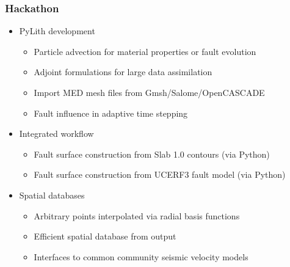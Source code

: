 \documentclass[aspectratio=169]{beamer}
\begin{document}
\begin{frame}
  \frametitle{Hackathon}
  \summary{}
  
  \begin{itemize}
  \item PyLith development
    \begin{itemize}
    \item Particle advection for material properties or fault evolution
    \item Adjoint formulations for large data assimilation
    \item Import MED mesh files from Gmsh/Salome/OpenCASCADE
    \item Fault influence in adaptive time stepping
    \end{itemize}
  \item Integrated workflow
    \begin{itemize}
    \item Fault surface construction from Slab 1.0 contours (via Python)
    \item Fault surface construction from UCERF3 fault model (via Python)
    \end{itemize}
  \item Spatial databases
    \begin{itemize}
    \item Arbitrary points interpolated via radial basis functions
    \item Efficient spatial database from output
    \item Interfaces to common community seismic velocity models
    \end{itemize}
  \end{itemize}

\end{frame}


 
\end{document}
